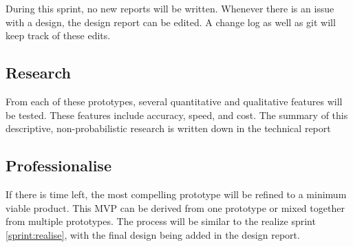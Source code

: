 During this sprint, no new reports will be written. Whenever there is an issue with a design, the design report can be edited. A change log as well as git will keep track of these edits.

\subsection{Research} \label{sprint:research}
From each of these prototypes, several quantitative and qualitative features will be tested. These features include accuracy, speed, and cost. The summary of this descriptive, non-probabilistic research is written down in the technical report

\subsection{Professionalise} \label{sprint:professionalise}
If there is time left, the most compelling prototype will be refined to a minimum viable product. \cite{mvp} This \gls{MVP} can be derived from one prototype or mixed together from multiple prototypes. The process will be similar to the realize sprint \ref{sprint:realise}, with the final design being added in the design report.
